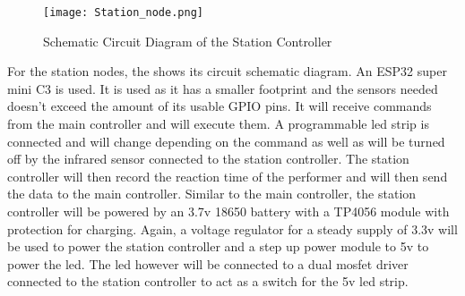 \begin{figure}[h]               
	\centering                    
	\texttt{[image: Station\_node.png]}      
	\caption{Schematic Circuit Diagram of the Station Controller }
	\label{fig:Station_node}
\end{figure}

For the station nodes, the  shows its circuit schematic diagram. An ESP32 super mini C3 is used. It is used as it has a smaller footprint and the sensors needed doesn't exceed the amount of its usable GPIO pins. It will receive commands from the main controller and will execute them. A programmable led strip is connected and will change depending on the command as well as will be turned off by the infrared sensor connected to the station controller. The station controller will then record the reaction time of the performer and will then send the data to the main controller. Similar to the main controller, the station controller will be powered by an 3.7v 18650 battery with a TP4056 module with protection for charging. Again, a voltage regulator for a steady supply of 3.3v will be used to power the station controller and a step up power module to 5v to power the led. The led however will be connected to a dual mosfet driver connected to the station controller to act as a switch for the 5v led strip.
